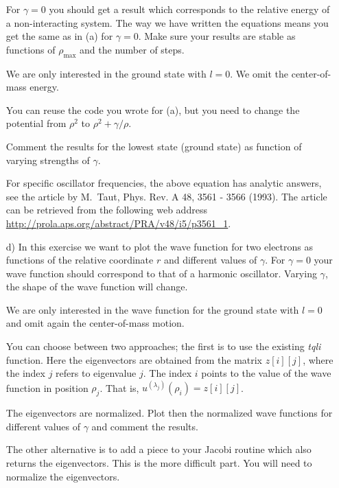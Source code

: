 \begin{prob}
\begin{enumerate}
For $\gamma =0$ you should get a result which corresponds to 
the relative energy of a non-interacting system.  The way we have written the equations means you get the same as in (a) for $\gamma =0$. 
Make sure your results are 
stable as functions of $\rho_{\mathrm{max}}$ and the number of steps.

We are only interested in the ground state with $l=0$. We omit the 
center-of-mass energy.

You can reuse the code you wrote for (a), 
but you need to change the potential
from $\rho^2$ to $\rho^2+\gamma/\rho$. 

Comment the results for the lowest state (ground state) as function of
varying strengths of $\gamma$. 


For specific oscillator frequencies, the above equation has analytic answers,
see the article by M.~Taut, Phys. Rev. A 48, 3561 - 3566 (1993).
The article can be retrieved from the following web address
\url{http://prola.aps.org/abstract/PRA/v48/i5/p3561_1}.

\item[d)]
In this exercise we want to plot the wave function 
for two electrons as functions of the relative coordinate $r$ and different
values of $\gamma$. For $\gamma =0$ your wave function should correspond to that
of a harmonic oscillator.  Varying $\gamma$, the shape of the wave function
will change.  

We are only interested in the wave function for the ground state with $l=0$ and
omit again the  center-of-mass motion.

You can choose between two approaches; the first is to use the existing
{\em tqli} function. Here the eigenvectors are obtained from the matrix
$z[i][j]$, where the index $j$ refers to eigenvalue $j$. The index $i$
points to the value of the wave function in position $\rho_j$.  
That is,  $u^{(\lambda_j)}(\rho_i)=z[i][j]$.   

The eigenvectors are normalized. 
Plot then the normalized wave functions for different 
values of $\gamma$ and comment the results.

The other alternative is to add a piece to your Jacobi routine which also
returns the eigenvectors. This is the more difficult part.
You will need to normalize the eigenvectors.


\end{enumerate}
\end{prob}



